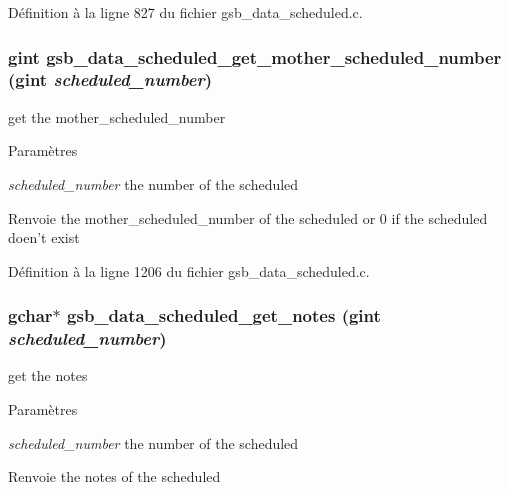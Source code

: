 Définition à la ligne 827 du fichier gsb\_\-data\_\-scheduled.c.

\subsubsection[{gsb\_\-data\_\-scheduled\_\-get\_\-mother\_\-scheduled\_\-number}]{\setlength{\rightskip}{0pt plus 5cm}gint gsb\_\-data\_\-scheduled\_\-get\_\-mother\_\-scheduled\_\-number (gint {\em scheduled\_\-number})}\label{gsb__data__scheduled_8h_a3f8e6e2985be6cb88c0f38965b75d804}
get the mother\_\-scheduled\_\-number


\begin{DoxyParams}{Paramètres}
\item[{\em scheduled\_\-number}]the number of the scheduled\end{DoxyParams}
\begin{DoxyReturn}{Renvoie}
the mother\_\-scheduled\_\-number of the scheduled or 0 if the scheduled doen't exist 
\end{DoxyReturn}


Définition à la ligne 1206 du fichier gsb\_\-data\_\-scheduled.c.

\subsubsection[{gsb\_\-data\_\-scheduled\_\-get\_\-notes}]{\setlength{\rightskip}{0pt plus 5cm}gchar$\ast$ gsb\_\-data\_\-scheduled\_\-get\_\-notes (gint {\em scheduled\_\-number})}\label{gsb__data__scheduled_8h_a77f3e371acac87303d217a472d5ebc3d}
get the notes


\begin{DoxyParams}{Paramètres}
\item[{\em scheduled\_\-number}]the number of the scheduled\end{DoxyParams}
\begin{DoxyReturn}{Renvoie}
the notes of the scheduled 
\end{DoxyReturn}



